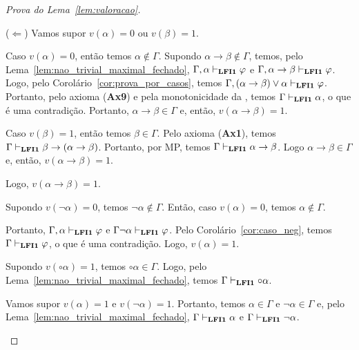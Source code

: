 \begin{proof}[Prova do Lema~\ref{lem:valoracao}]
\begin{provaporcasos}
\begin{adjustwidth}{1cm}{}
                        \noindent ($\Longleftarrow$) Vamos supor $v(\alpha) = 0$ ou $v(\beta) = 1$.

                        \noindent Caso $v(\alpha) = 0$, então temos $\alpha \not \in \Gamma$. Supondo $\alpha \to \beta \not \in \Gamma$, temos, pelo Lema~\ref{lem:nao_trivial_maximal_fechado}, $\Gamma, \alpha \vdash_{{\normalfont\textbf{LFI1}}{}} \varphi$ e $\Gamma, \alpha \to \beta \vdash_{{\normalfont\textbf{LFI1}}{}} \varphi$. Logo, pelo Corolário~\ref{cor:prova_por_casos}, temos $\Gamma, (\alpha \to \beta) \lor \alpha \vdash_{{\normalfont\textbf{LFI1}}{}} \varphi$. Portanto, pelo axioma (\textbf{Ax9}) e pela monotonicidade da \lfium{}, temos $\Gamma \vdash_{{\normalfont\textbf{LFI1}}{}} \alpha$, o que é uma contradição. Portanto, $\alpha \to \beta \in \Gamma$ e, então, $v(\alpha \to \beta) = 1$.

                        \noindent Caso $v(\beta) = 1$, então temos $\beta \in \Gamma$. Pelo axioma (\textbf{Ax1}), temos $\Gamma \vdash_{{\normalfont\textbf{LFI1}}{}} \beta \to (\alpha \to \beta)$. Portanto, por MP, temos $\Gamma \vdash_{{\normalfont\textbf{LFI1}}{}} \alpha \to \beta$. Logo $\alpha \to \beta \in \Gamma$ e, então, $v(\alpha \to \beta) = 1$.

                        \noindent Logo, $v(\alpha \to \beta) = 1$.

                    \end{adjustwidth}

                    
                    \begin{adjustwidth}{1cm}{}
                        \noindent Supondo $v(\neg \alpha) = 0$, temos $\neg \alpha \not \in \Gamma$. Então, caso $v(\alpha) = 0$, temos $\alpha \not \in \Gamma$. 
                        
                        \noindent Portanto, $\Gamma, \alpha \vdash_{{\normalfont\textbf{LFI1}}{}} \varphi$ e $\Gamma \neg \alpha \vdash_{{\normalfont\textbf{LFI1}}{}} \varphi$. Pelo Corolário~\ref{cor:caso_neg}, temos $\Gamma \vdash_{{\normalfont\textbf{LFI1}}{}} \varphi$, o que é uma contradição. Logo, $v(\alpha) = 1$.

                    \end{adjustwidth}


                    \begin{adjustwidth}{1cm}{}
                        \noindent Supondo $v(\circ \alpha) = 1$, temos $\circ \alpha \in \Gamma$. Logo, pelo Lema~\ref{lem:nao_trivial_maximal_fechado}, temos $\Gamma \vdash_{{\normalfont\textbf{LFI1}}{}} \circ \alpha$.

                        \noindent Vamos supor $v(\alpha) = 1$ e $v(\neg \alpha) = 1$. Portanto, temos $\alpha \in \Gamma$ e $\neg \alpha \in \Gamma$ e, pelo Lema~\ref{lem:nao_trivial_maximal_fechado}, $\Gamma \vdash_{{\normalfont\textbf{LFI1}}{}} \alpha$ e $\Gamma \vdash_{{\normalfont\textbf{LFI1}}{}} \neg \alpha$.


\end{adjustwidth}
\end{provaporcasos}
\end{proof}
